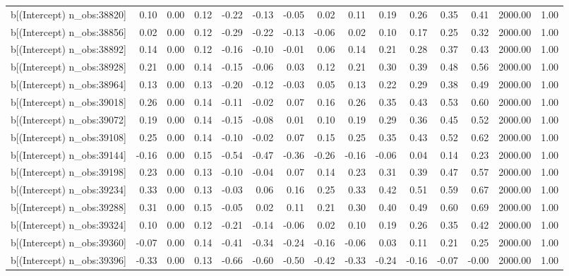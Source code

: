 \begin{table}[ht]
\begin{tabular}{rrrrrrrrrrrrrrr}
  b[(Intercept) n\_obs:38820] & 0.10 & 0.00 & 0.12 & -0.22 & -0.13 & -0.05 & 0.02 & 0.11 & 0.19 & 0.26 & 0.35 & 0.41 & 2000.00 & 1.00 \\ 
  b[(Intercept) n\_obs:38856] & 0.02 & 0.00 & 0.12 & -0.29 & -0.22 & -0.13 & -0.06 & 0.02 & 0.10 & 0.17 & 0.25 & 0.32 & 2000.00 & 1.00 \\ 
  b[(Intercept) n\_obs:38892] & 0.14 & 0.00 & 0.12 & -0.16 & -0.10 & -0.01 & 0.06 & 0.14 & 0.21 & 0.28 & 0.37 & 0.43 & 2000.00 & 1.00 \\ 
  b[(Intercept) n\_obs:38928] & 0.21 & 0.00 & 0.14 & -0.15 & -0.06 & 0.03 & 0.12 & 0.21 & 0.30 & 0.39 & 0.48 & 0.56 & 2000.00 & 1.00 \\ 
  b[(Intercept) n\_obs:38964] & 0.13 & 0.00 & 0.13 & -0.20 & -0.12 & -0.03 & 0.05 & 0.13 & 0.22 & 0.29 & 0.38 & 0.49 & 2000.00 & 1.00 \\ 
  b[(Intercept) n\_obs:39018] & 0.26 & 0.00 & 0.14 & -0.11 & -0.02 & 0.07 & 0.16 & 0.26 & 0.35 & 0.43 & 0.53 & 0.60 & 2000.00 & 1.00 \\ 
  b[(Intercept) n\_obs:39072] & 0.19 & 0.00 & 0.14 & -0.15 & -0.08 & 0.01 & 0.10 & 0.19 & 0.29 & 0.36 & 0.45 & 0.52 & 2000.00 & 1.00 \\ 
  b[(Intercept) n\_obs:39108] & 0.25 & 0.00 & 0.14 & -0.10 & -0.02 & 0.07 & 0.15 & 0.25 & 0.35 & 0.43 & 0.52 & 0.62 & 2000.00 & 1.00 \\ 
  b[(Intercept) n\_obs:39144] & -0.16 & 0.00 & 0.15 & -0.54 & -0.47 & -0.36 & -0.26 & -0.16 & -0.06 & 0.04 & 0.14 & 0.23 & 2000.00 & 1.00 \\ 
  b[(Intercept) n\_obs:39198] & 0.23 & 0.00 & 0.13 & -0.10 & -0.04 & 0.07 & 0.14 & 0.23 & 0.31 & 0.39 & 0.47 & 0.57 & 2000.00 & 1.00 \\ 
  b[(Intercept) n\_obs:39234] & 0.33 & 0.00 & 0.13 & -0.03 & 0.06 & 0.16 & 0.25 & 0.33 & 0.42 & 0.51 & 0.59 & 0.67 & 2000.00 & 1.00 \\ 
  b[(Intercept) n\_obs:39288] & 0.31 & 0.00 & 0.15 & -0.05 & 0.02 & 0.11 & 0.21 & 0.30 & 0.40 & 0.49 & 0.60 & 0.69 & 2000.00 & 1.00 \\ 
  b[(Intercept) n\_obs:39324] & 0.10 & 0.00 & 0.12 & -0.21 & -0.14 & -0.06 & 0.02 & 0.10 & 0.19 & 0.26 & 0.35 & 0.42 & 2000.00 & 1.00 \\ 
  b[(Intercept) n\_obs:39360] & -0.07 & 0.00 & 0.14 & -0.41 & -0.34 & -0.24 & -0.16 & -0.06 & 0.03 & 0.11 & 0.21 & 0.25 & 2000.00 & 1.00 \\ 
  b[(Intercept) n\_obs:39396] & -0.33 & 0.00 & 0.13 & -0.66 & -0.60 & -0.50 & -0.42 & -0.33 & -0.24 & -0.16 & -0.07 & -0.00 & 2000.00 & 1.00 \\ 

\end{tabular}
\end{table}
